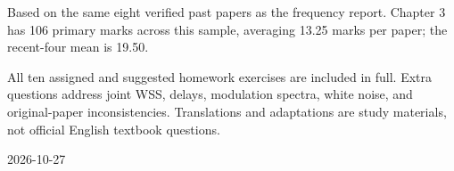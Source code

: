 \documentclass[11pt]{article}
\begin{document}
\begin{titlepage}\centering\vspace*{1.5cm}{\Huge\bfseries Stochastic Signal Analysis}\par\vspace{1cm}{\LARGE\bfseries Chapter 3 Review Problem Set}\par\vspace{6mm}{\large Stationarity and Power Spectral Density}\par\vspace{1cm}{\large 21 problems / 7 days / 3 problems per day}\par\vspace{1cm}
\begin{tcolorbox}[colback=qbg,colframe=navy]Based on the same eight verified past papers as the frequency report. Chapter 3 has 106 primary marks across this sample, averaging 13.25 marks per paper; the recent-four mean is 19.50.\par All ten assigned and suggested homework exercises are included in full. Extra questions address joint WSS, delays, modulation spectra, white noise, and original-paper inconsistencies. Translations and adaptations are study materials, not official English textbook questions.\end{tcolorbox}\vfill 2026-10-27\end{titlepage}
\end{document}

